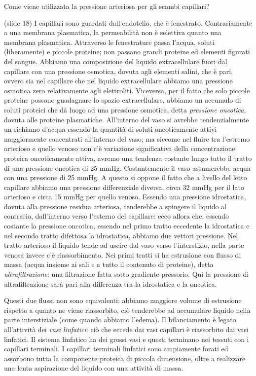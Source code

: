 \documentclass[a4paper,12pt]{article}
\begin{document}
Come viene utilizzata la pressione arteriosa per gli scambi capillari?

(slide 18) I capillari sono guardati dall'endotelio, che è fenestrato. Contrariamente a una membrana plasmatica, la permeabilità non è selettiva quanto una membrana plasmatica. Attraverso le fenestrature passa l'acqua, soluti (liberamente) e piccole proteine; non passano grandi proteine ed elementi figurati del sangue. Abbiamo una composizione del liquido extracellulare fuori dal capillare con una pressione osmotica, dovuta agli elementi salini, che è pari, ovvero sia nel capillare che nel liquido extracellulare abbiamo una pressione osmotica zero relativamente agli elettroliti. Viceversa, per il fatto che solo piccole proteine possono guadagnare lo spazio extracellulare, abbiamo un accumulo di soluti proteici che dà luogo ad una pressione osmotica, detta \emph{pressione oncotica}, dovuta alle proteine plasmatiche. All'interno del vaso si avrebbe tendenzialmente un richiamo d'acqua essendo la quantità di soluti oncoticamente attivi maggiormente concentrati all'interno del vaso; ma siccome nel fluire tra l'estremo arterioso e quello venoso non c'è variazione significativa della concentrazione proteica oncoticamente attiva, avremo una tendenza costante lungo tutto il tratto di una pressione oncotica di 25 mmHg. Costantemente il vaso assumerebbe acqua con una pressione di 25 mmHg. A questo si oppone il fatto che a livello del letto capillare abbiamo una pressione differenziale diversa, circa 32 mmHg per il lato arterioso e circa 15 mmHg per quello venoso. Essendo una pressione idrostatica, dovuta alla pressione residua arteriosa, tenderebbe a spingere il liquido al contrario, dall'interno verso l'esterno del capillare: ecco allora che, essendo costante la pressione oncotica, essendo nel primo tratto eccedente la idrostatica e nel secondo tratto difettosa la idrostatica, abbiamo due vettori pressione. Nel tratto arterioso il liquido tende ad uscire dal vaso verso l'interstizio, nella parte venosa invece c'è riassorbimento. Nei primi tratti si ha estrusione con flusso di massa (acqua insieme ai sali e a tutto il contenuto di proteine), detta \emph{ultrafiltrazione}: una filtrazione fatta sotto gradiente pressorio. Qui la pressione di ultrafiltrazione sarà pari alla differenza tra la idrostatica e la oncotica. 

Questi due flussi non sono equivalenti: abbiamo maggiore volume di estrusione rispetto a quanto ne viene riassorbito, ciò tenderebbe ad accumulare liquido nella parte interstiziale (come quando abbiamo l'edema). Il bilanciamento è legato all'attività dei \emph{vasi linfatici}: ciò che eccede dai vasi capillari è riassorbito dai vasi linfatici. Il sistema linfatico ha dei grossi vasi e questi terminano nei tessuti con i capillari terminali. I capillari terminali linfatici sono ampiamente forati ed assorbono tutta la componente proteica di piccola dimensione, oltre a realizzare una lenta aspirazione del liquido con una attività di massa.
\end{document}
